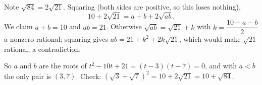 Note $\sqrt{84}=2\sqrt{21}$. Squaring (both sides are positive, so this loses nothing),
\[10+2\sqrt{21}=a+b+2\sqrt{ab}.\]
We claim $a+b=10$ and $ab=21$. Otherwise $\sqrt{ab}=\sqrt{21}+k$ with $k=\dfrac{10-a-b}{2}$ a nonzero rational; squaring gives $ab=21+k^2+2k\sqrt{21}$, which would make $\sqrt{21}$ rational, a contradiction.

So $a$ and $b$ are the roots of $t^2-10t+21=(t-3)(t-7)=0$, and with $a<b$ the only pair is $\boxed{(3,7)}$. Check: $\left(\sqrt3+\sqrt7\right)^2=10+2\sqrt{21}=10+\sqrt{84}$.
